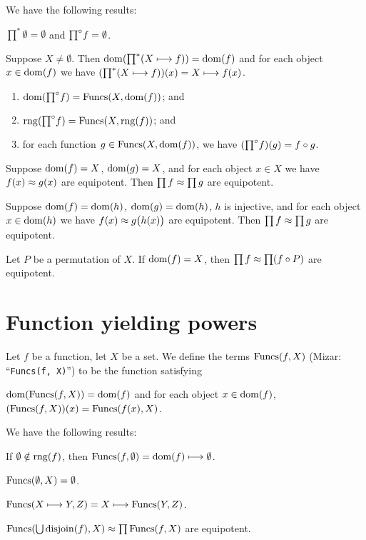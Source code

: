 \documentclass{article}
\begin{document}
We have the following results:
\begin{thm}
\item\label{funct6:40} ${\prod}^{*}\emptyset=\emptyset$ and $\Frege{\emptyset}=\emptyset$.
\item\label{funct6:41} Suppose $X\neq\emptyset$.
  Then $\dom({\prod}^{*}(X\constantto f))=\dom(f)$ and for each object $x\in\dom(f)$
  we have $({\prod}^{*}(X\constantto f))(x)=X\constantto f(x)$.
\item\label{funct6:42}
  \begin{enumerate}[label=(\roman*)]
  \item $\dom(\Frege{X\constantto f})=\Funcs(X,\dom(f))$; and
  \item $\rng(\Frege{X\constantto f})=\Funcs(X,\rng(f))$; and
  \item for each function $g\in\Funcs(X,\dom(f))$, we have
    $(\Frege{X\constantto f})(g)=f\circ g$.
  \end{enumerate}
\item\label{funct6:43} Suppose $\dom(f)=X$, $\dom(g)=X$, and for each object
  $x\in X$ we have $f(x)\equipotent g(x)$ are equipotent.
  Then $\prod f\equipotent\prod g$ are equipotent.
\item\label{funct6:44} Suppose $\dom(f)=\dom(h)$, $\dom(g)=\dom(h)$, $h$
  is injective, and for each object $x\in\dom(h)$ we have
  $f(x)\equipotent g\bigl(h(x)\bigr)$ are equipotent.
  Then $\prod f\equipotent\prod g$ are equipotent.
\item\label{funct6:45} Let $P$ be a permutation of $X$.
  If $\dom(f)=X$, then $\prod f\equipotent\prod(f\circ P)$ are equipotent.
\end{thm}

\section{Function yielding powers}

\begin{definition}
Let $f$ be a function, let $X$ be a set.
We define the terms $\Funcs(f,X)$ (Mizar: ``\verb#Funcs(f, X)#'') to be
the function satisfying
\begin{defn}
\item $\dom(\Funcs(f,X))=\dom(f)$ and for each object $x\in\dom(f)$,
  $(\Funcs(f,X))(x)=\Funcs(f(x),X)$.
\end{defn}
\end{definition}

We have the following results:
\begin{thm}
\item\label{funct6:46} If $\emptyset\notin\rng(f)$,
  then $\Funcs(f,\emptyset)=\dom(f)\constantto\emptyset$.
\item\label{funct6:47} $\Funcs(\emptyset,X)=\emptyset$.
\item\label{funct6:48} $\Funcs(X\constantto Y,Z)=X\constantto\Funcs(Y,Z)$.
\item\label{funct6:49} $\Funcs(\Union\disjoin f,X)\equipotent\prod\Funcs(f,X)$
  are equipotent.
\end{thm}
\end{document}
